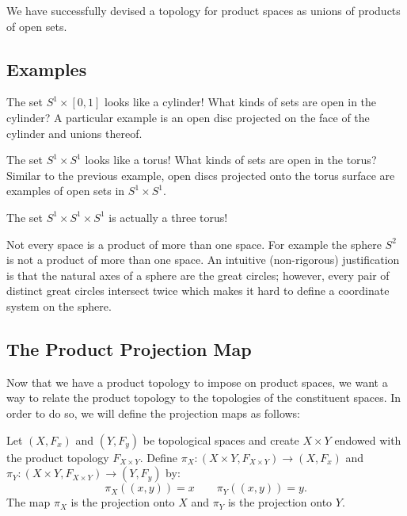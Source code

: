 We have successfully devised a topology for product spaces as unions of products of open sets.


\subsection{Examples}

\begin{example}
The set $S^1 \times [0,1]$ looks like a cylinder! What kinds of sets are open in the cylinder? A particular example is an open disc projected on the face of the cylinder and unions thereof.
\end{example}

\placeholder

\begin{example}
The set $S^1 \times S^1$ looks like a torus! What kinds of sets are open in the torus? Similar to the previous example, open discs projected onto the torus surface are examples of open sets in $S^1\times S^1$.
\end{example}

\placeholder

\begin{example}
The set $S^1 \times S^1 \times S^1$ is actually a three torus!
\end{example}

\placeholder


Not every space is a product of more than one space. For example the sphere $S^2$ is not a product of more than one space. An intuitive (non-rigorous) justification is that the natural axes of a sphere are the great circles; however, every pair of distinct great circles intersect twice which makes it hard to define a coordinate system on the sphere.


\subsection{The Product Projection Map}

Now that we have a product topology to impose on product spaces, we want a way to relate the product topology to the topologies of the constituent spaces. In order to do so, we will define the projection maps as follows:
\begin{definition}
Let $(X,F_x)$ and $(Y,F_y)$ be topological spaces and create $X\times Y$ endowed with the product topology $F_{X\times Y}$. Define $\pi_X: (X\times Y,F_{X\times Y}) \to (X,F_x)$ and $\pi_Y:(X\times Y,F_{X\times Y}) \to (Y,F_y)$  by:
\[\pi_X((x,y)) = x  \qquad \pi_Y((x,y)) = y.\]
The map $\pi_X$ is the projection onto $X$ and $\pi_Y$ is the projection onto $Y$.
\end{definition}

